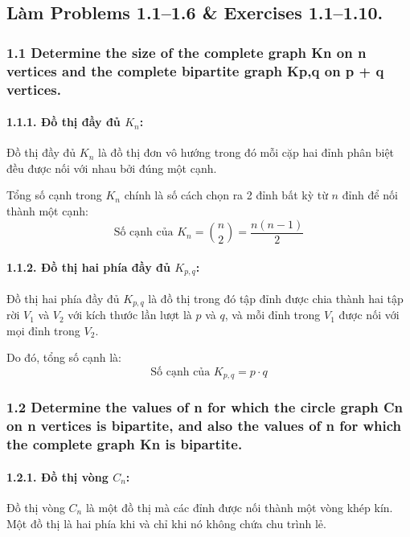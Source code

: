 \documentclass{article}
\begin{document}
	\subsection*{Làm Problems 1.1--1.6 \& Exercises 1.1--1.10.}
	
	\subsubsection*{1.1  Determine the size of the complete graph Kn on n vertices and the complete bipartite graph Kp,q on p + q vertices.}
	
	\paragraph*{1.1.1. Đồ thị đầy đủ \( K_n \):}
	
	Đồ thị đầy đủ \( K_n \) là đồ thị đơn vô hướng trong đó mỗi cặp hai đỉnh phân biệt đều được nối với nhau bởi đúng một cạnh.
	
	Tổng số cạnh trong \( K_n \) chính là số cách chọn ra 2 đỉnh bất kỳ từ \( n \) đỉnh để nối thành một cạnh:
	\[
	\text{Số cạnh của } K_n = \binom{n}{2} = \frac{n(n-1)}{2}
	\]
	
	\paragraph*{1.1.2. Đồ thị hai phía đầy đủ \( K_{p,q} \):}
	
	Đồ thị hai phía đầy đủ \( K_{p,q} \) là đồ thị trong đó tập đỉnh được chia thành hai tập rời \( V_1 \) và \( V_2 \) với kích thước lần lượt là \( p \) và \( q \), và mỗi đỉnh trong \( V_1 \) được nối với mọi đỉnh trong \( V_2 \).
	
	Do đó, tổng số cạnh là:
	\[
	\text{Số cạnh của } K_{p,q} = p \cdot q
	\]
	
	\subsubsection*{1.2 Determine the values of n for which the circle graph Cn on n vertices is bipartite,  and also the values of n for which the complete graph Kn is bipartite.}
	
	\paragraph*{1.2.1. Đồ thị vòng \( C_n \):}
	
	Đồ thị vòng \( C_n \) là một đồ thị mà các đỉnh được nối thành một vòng khép kín. Một đồ thị là hai phía khi và chỉ khi nó không chứa chu trình lẻ.
	
\end{document}
